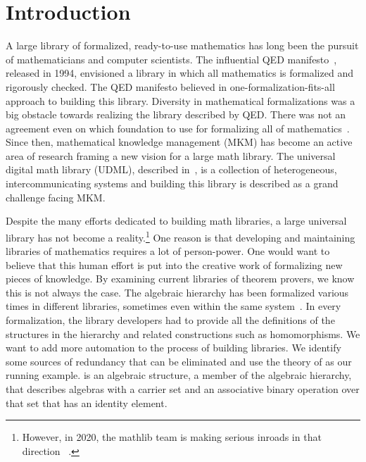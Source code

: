 \chapter{Introduction}
\label{ch:intro}

A large library of formalized, ready-to-use mathematics has long been the pursuit of mathematicians and computer scientists.  
The influential QED manifesto~\citep{boyer1994qed}, released in 1994, envisioned a library in which all mathematics is formalized and rigorously checked. The QED manifesto believed in one-formalization-fits-all approach to building this library.
Diversity in mathematical formalizations was a big obstacle towards realizing the library described by QED. There was not an agreement even on which foundation to use for formalizing all of mathematics~\cite{qedrealoaded2016}.  Since then, mathematical knowledge management (MKM) has become an active area of research framing a new vision for a large math library. The universal digital math library (UDML), described in~\cite{farmer2004mkm}, is a collection of heterogeneous, intercommunicating systems and building this library is described as a grand challenge facing MKM. 

Despite the many efforts dedicated to building math libraries, a large universal library has not become a reality.\footnote{However, in 2020, the mathlib team is making serious inroads in that direction~\cite{lean2019} .} One reason is that developing and maintaining libraries of mathematics requires a lot of person-power. One would want to believe that this human effort is put into the creative work of formalizing new pieces of knowledge. By examining current libraries of theorem provers, we know this is not always the case. 
The algebraic hierarchy has been formalized various times in different libraries, sometimes even within the same system~\cite{Geuvers2002, Gonthier2009, Spitters2010, coq-contribs-algebra}. 
In every formalization, the library developers had to provide all the definitions of the structures in the hierarchy and related constructions such as homomorphisms. We want to add more automation to the process of building libraries. We identify some sources of redundancy that can be eliminated and use the theory of  as our running example.  is an algebraic structure, a member of the algebraic hierarchy, that describes algebras with a carrier set and an associative binary operation over that set that has an identity element.

